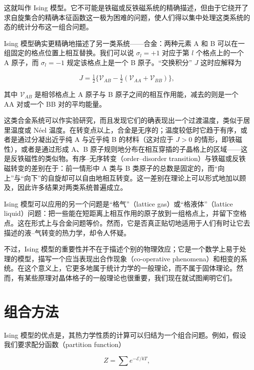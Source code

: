 这就叫作 Ising 模型。它不可能是铁磁或反铁磁系统的精确描述，但由于它绕开了求自旋集合的精确本征函数这一极为困难的问题，使人们得以集中处理这类系统的态的统计分布这一组合问题。

Ising 模型确实更精确地描述了另一类系统——合金：两种元素 A 和 B 可以在一组固定的格点位置上相互替换。我们可以说 $\sigma_l = +1$ 对应于第 $l$ 个格点上的一个 A 原子，而 $\sigma_l = -1$ 规定该格点上是一个 B 原子。“交换积分” $J$ 这时应解释为

\begin{equation*}
J = \tfrac{1}{2}\bigl\{ \mathcal{V}_{AB} - \tfrac{1}{2}(\mathcal{V}_{AA} + \mathcal{V}_{BB}) \bigr\},
\tag{10.70}
\end{equation*}

其中 $\mathcal{V}_{AB}$ 是相邻格点上 A 原子与 B 原子之间的相互作用能，减去的则是一个 AA 对或一个 BB 对的平均能量。

这类合金系统可以作实验研究，而且发现它们的确表现出一个过渡温度，类似于居里温度或 Néel 温度。在转变点以上，合金是无序的；温度较低时它趋于有序，或者是通过分凝出近乎纯 A 与近乎纯 B 的材料（这对应于 $J > 0$ 的情形，即铁磁性），或者是通过形成 A、B 原子规则地分布在相互穿插的子晶格上的区域——这是反铁磁性的类似物。有序–无序转变（order–disorder transition）与铁磁或反铁磁转变的差别在于：前一情形中 A 类与 B 类原子的总数是固定的，而“向上”与“向下”的自旋却可以自由地相互转变。这一差别在理论上可以形式地加以顾及，因此许多结果对两类系统普遍成立。

Ising 模型可以应用的另一个问题是“格气”（lattice gas）或“格液体”（lattice liquid）问题：把一些能在短距离上相互作用的原子放到一组格点上，并留下空格点。这在形式上与合金问题等价。然而，它是否真正贴切地适用于人们有时让它去描述的液–气转变的热力学，却令人怀疑。

不过，Ising 模型的重要性并不在于描述个别的物理效应；它是一个数学上易于处理的模型，描写一个应当表现出合作现象（co-operative phenomena）和相变的系统。在这个意义上，它更多地属于统计力学的一般理论，而不属于固体理论。然而，有某些原理对晶体格子的一般理论也很重要，我们现在就试图阐明它们。

\section{组合方法}

Ising 模型的优点是，其热力学性质的计算可以归结为一个组合问题。例如，假设我们要求配分函数（partition function）

\begin{equation*}
Z = \sum e^{-\mathcal{E}/kT},
\tag{10.71}
\end{equation*}

